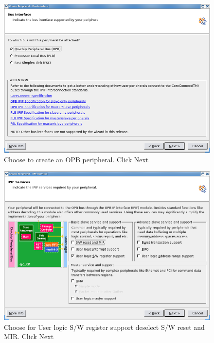 \documentclass[a4paper,oneside]{memoir}
\begin{document}
\begin{figure}[H]
\centering
\includegraphics[scale=0.5]{COIP5}
\caption{Choose to create an OPB peripheral. Click Next\label{fig:COIP5}}
\end{figure}
\begin{figure}[H]
\centering
\includegraphics[scale=0.5]{COIP6}
\caption{Choose for User logic S/W register support deselect S/W reset and MIR. Click Next\label{fig:COIP6}}
\end{figure}
\end{document}
